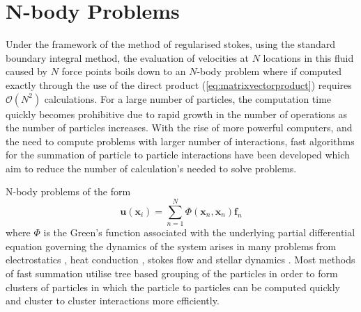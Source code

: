 \FloatBarrier
\section{N-body Problems} \label{sec:Nbody}

Under the framework of the method of regularised stokes, using the standard boundary integral method, the evaluation of velocities at $N$ locations in this fluid caused by $N$ force points boils down to an $N$-body problem where if computed exactly through the use of the direct product (\cref{eq:matrixvectorproduct}) requires $\mathcal{O}(N^2)$ calculations. For a large number of particles, the computation time quickly becomes prohibitive due to rapid growth in the number of operations as the number of particles increases. With the rise of more powerful computers, and the need to compute problems with larger number of interactions, fast algorithms for the summation of particle to particle interactions have been developed which aim to reduce the number of calculation's needed to solve problems. 

N-body problems of the form
\begin{equation*}
    \bm{u}(\bm{x}_i) = \sum_{n=1}^N \Phi(\bm{x}_n,{\bm{x}}_n){\bm{f}}_n
\end{equation*}
where $\Phi$ is the Green's function associated with the underlying partial differential equation governing the dynamics of the system arises in many problems from electrostatics \cite{Beatson,Tornberg2008}, heat conduction \cite{Greengard1990APotentials}, stokes flow \cite{Cortez2015,Tornberg2008} and stellar dynamics \cite{Dehnen2014ADynamics}. Most methods of fast summation utilise tree based grouping of the particles in order to form clusters of particles in which the particle to particles can be computed quickly and cluster to cluster interactions more efficiently. 

